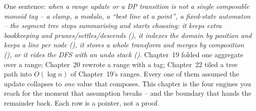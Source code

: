 

One sentence: \emph{when a range update or a DP transition is \emph{not} a single composable
monoid tag -- a clamp, a modulo, a ``best line at a point'', a fixed-state automaton -- the
segment tree stops summarising and starts \emph{choosing}: it keeps extra bookkeeping and
prunes/settles/descends (), it indexes the domain by position and keeps a
line per node (), it stores a whole \emph{transform} and merges by
composition (), or it rides the DFS with an undo stack ().}
Chapter~19 folded one aggregate over a range; Chapter~20 rewrote a range with a tag;
Chapter~22 tiled a tree path into \(O(\log n)\) of Chapter~19's ranges. Every one of them assumed
the update collapses to \emph{one} value that composes. This chapter is the four engines you reach
for the moment that assumption breaks -- and the boundary that hands the remainder back. Each row
is a pointer, not a proof.

